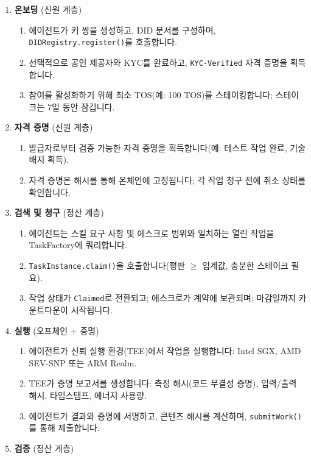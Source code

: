 \documentclass[11pt]{article}
\begin{document}
\begin{enumerate}
  \item \textbf{온보딩} (신원 계층)
    \begin{enumerate}[label=\alph*.]
      \item 에이전트가 키 쌍을 생성하고, DID 문서를 구성하며, \texttt{DIDRegistry.register()}를 호출합니다.
      \item 선택적으로 공인 제공자와 KYC를 완료하고, \texttt{KYC-Verified} 자격 증명을 획득합니다.
      \item 참여를 활성화하기 위해 최소 TOS(예: 100 TOS)를 스테이킹합니다; 스테이크는 7일 동안 잠깁니다.
    \end{enumerate}
  \item \textbf{자격 증명} (신원 계층)
    \begin{enumerate}[label=\alph*.]
      \item 발급자로부터 검증 가능한 자격 증명을 획득합니다(예: 테스트 작업 완료, 기술 배지 획득).
      \item 자격 증명은 해시를 통해 온체인에 고정됩니다; 각 작업 청구 전에 취소 상태를 확인합니다.
    \end{enumerate}
  \item \textbf{검색 및 청구} (정산 계층)
    \begin{enumerate}[label=\alph*.]
      \item 에이전트는 스킬 요구 사항 및 에스크로 범위와 일치하는 열린 작업을 TaskFactory에 쿼리합니다.
      \item \texttt{TaskInstance.claim()}을 호출합니다(평판 $\geq$ 임계값, 충분한 스테이크 필요).
      \item 작업 상태가 \texttt{Claimed}로 전환되고; 에스크로가 계약에 보관되며; 마감일까지 카운트다운이 시작됩니다.
    \end{enumerate}
  \item \textbf{실행} (오프체인 + 증명)
    \begin{enumerate}[label=\alph*.]
      \item 에이전트가 신뢰 실행 환경(TEE)에서 작업을 실행합니다: Intel SGX, AMD SEV-SNP 또는 ARM Realm.
      \item TEE가 증명 보고서를 생성합니다: 측정 해시(코드 무결성 증명), 입력/출력 해시, 타임스탬프, 에너지 사용량.
      \item 에이전트가 결과와 증명에 서명하고, 콘텐츠 해시를 계산하며, \texttt{submitWork()}를 통해 제출합니다.
    \end{enumerate}
  \item \textbf{검증} (정산 계층)
    \begin{enumerate}[label=\alph*.]

\end{enumerate}
\end{enumerate}
\end{document}
